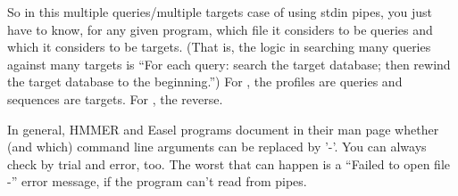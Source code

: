 
So in this multiple queries/multiple targets case of using stdin
pipes, you just have to know, for any given program, which file it
considers to be queries and which it considers to be targets. (That
is, the logic in searching many queries against many targets is ``For
each query: search the target database; then rewind the target
database to the beginning.'') For , the profiles are
queries and sequences are targets. For , the reverse.

In general, HMMER and Easel programs document in their man page
whether (and which) command line arguments can be replaced by '-'.
You can always check by trial and error, too. The worst that can
happen is a ``Failed to open file -'' error message, if the program
can't read from pipes.


